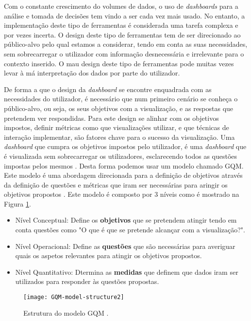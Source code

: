 Com o constante crescimento do volumes de dados, o uso de \textit{dashboards} para a análise e tomada de decisões tem vindo a ser cada vez mais usado. No entanto, a implementação deste tipo de ferramentas é considerada uma tarefa complexa e por vezes incerta. O design deste tipo de ferramentas tem de ser direcionado ao público-alvo pelo qual estamos a considerar, tendo em conta as suas necessidades, sem sobrecarregar o utilizador com informação desnecessária e irrelevante para o contexto inserido. O mau design deste tipo de ferramentas pode muitas vezes levar à má interpretação dos dados por parte do utilizador.

De forma a que o design da \textit{dashboard} se encontre enquadrada com as necessidades do utilizador, é necessário que num primeiro cenário se conheça o público-alvo, ou seja, os seus objetivos com a visualização, e as respostas que pretendem ver respondidas. Para este design se alinhar com os objetivos impostos, definir métricas como que visualizações utilizar, e que técnicas de interação implementar, são fatores chave para o sucesso da visualização. Uma \textit{dashboard} que cumpra os objetivos impostos pelo utilizador, é uma \textit{dashboard} que é visualizada sem sobrecarregar os utilizadores, esclarecendo todos as questões impostas pelos mesmos \cite{pappas2011riding}. Desta forma podemos usar um modelo chamado \gls{GQM}. Este modelo é uma abordagem direcionada para a definição de objetivos através da definição de questões e métricas que iram ser necessárias para aringir os objetivos propostos \cite{janes2013effective}. Este modelo é composto por 3 níveis como é mostrado na Figura \ref{fig:gqm-model}.

\begin{itemize}
  \item Nível Conceptual: Define os \textbf{objetivos} que se pretendem atingir tendo em conta questões como "O que é que se pretende alcançar com a visualização?".
  \item Nível Operacional: Define as \textbf{questões} que são necessárias para averiguar quais os aspetos relevantes para atingir os objetivos propostos. 
  \item Nível Quantitativo: Dtermina as \textbf{medidas} que definem que dados iram ser utilizados para responder às questões propostas.
\end{itemize}

\begin{figure}[htbp]
  \centering
  \texttt{[image: GQM-model-structure2]}
  \caption{Estrutura do modelo \gls{GQM} \cite{article}.}
  \label{fig:gqm-model}
\end{figure}

